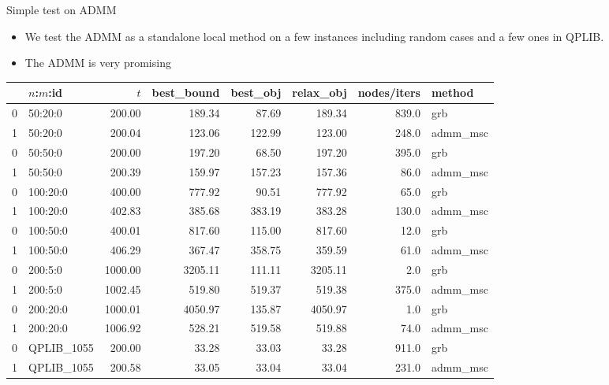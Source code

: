\documentclass[aspectratio=1610, 10pt]{beamer}
\begin{document}
\begin{frame}{Simple test on ADMM}




  \begin{itemize}
    \item We test the ADMM as a standalone local method on a few instances including random cases and a few ones in QPLIB.
    \item The ADMM is very promising
  \end{itemize}
  \begin{tabular}{llrrrrrl}
    \toprule
    {} & $n$:$m$:id  & $t$     & best\_bound & best\_obj & relax\_obj & nodes/iters & method    \\
    \midrule
    0  & 50:20:0     & 200.00  & 189.34      & 87.69     & 189.34     & 839.0       & grb       \\
    1  & 50:20:0     & 200.04  & 123.06      & 122.99    & 123.00     & 248.0       & admm\_msc \\
    0  & 50:50:0     & 200.00  & 197.20      & 68.50     & 197.20     & 395.0       & grb       \\
    1  & 50:50:0     & 200.39  & 159.97      & 157.23    & 157.36     & 86.0        & admm\_msc \\
    0  & 100:20:0    & 400.00  & 777.92      & 90.51     & 777.92     & 65.0        & grb       \\
    1  & 100:20:0    & 402.83  & 385.68      & 383.19    & 383.28     & 130.0       & admm\_msc \\
    0  & 100:50:0    & 400.01  & 817.60      & 115.00    & 817.60     & 12.0        & grb       \\
    1  & 100:50:0    & 406.29  & 367.47      & 358.75    & 359.59     & 61.0        & admm\_msc \\
    0  & 200:5:0     & 1000.00 & 3205.11     & 111.11    & 3205.11    & 2.0         & grb       \\
    1  & 200:5:0     & 1002.45 & 519.80      & 519.37    & 519.38     & 375.0       & admm\_msc \\
    0  & 200:20:0    & 1000.01 & 4050.97     & 135.87    & 4050.97    & 1.0         & grb       \\
    1  & 200:20:0    & 1006.92 & 528.21      & 519.58    & 519.88     & 74.0        & admm\_msc \\
    0  & QPLIB\_1055 & 200.00  & 33.28       & 33.03     & 33.28      & 911.0       & grb       \\
    1  & QPLIB\_1055 & 200.58  & 33.05       & 33.04     & 33.04      & 231.0       & admm\_msc \\
    \bottomrule
  \end{tabular}
\end{frame}
\end{document}

